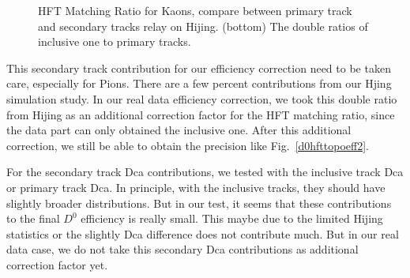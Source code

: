 \begin{figure}[htbp]
\begin{minipage}[htbp]{0.47\linewidth}
\caption{ HFT Matching Ratio for Kaons, compare between primary track and secondary tracks relay on Hijing.  (bottom) The double ratios of inclusive one to primary tracks.\label{HijingKaonsRatio}}
\end{minipage}
\end{figure}





This secondary track contribution for our efficiency correction need to be taken care, especially for Pions. There are a few percent contributions from our Hjing simulation study. In our real data efficiency correction, we took this double ratio from Hijing as an additional correction factor for the HFT matching ratio, since the data part can only obtained the inclusive one. After this additional correction, we still be able to obtain the precision like Fig.~\ref{d0hfttopoeff2}.

For the secondary track Dca contributions, we tested with the inclusive track Dca or primary track Dca. In principle, with the inclusive tracks, they should have slightly broader distributions. But in our test, it seems that these contributions to the final $D^0$ efficiency is really small. This maybe due to the limited Hijing statistics or the slightly Dca difference does not contribute much. But in our real data case, we do not take this secondary Dca contributions as additional correction factor yet.


